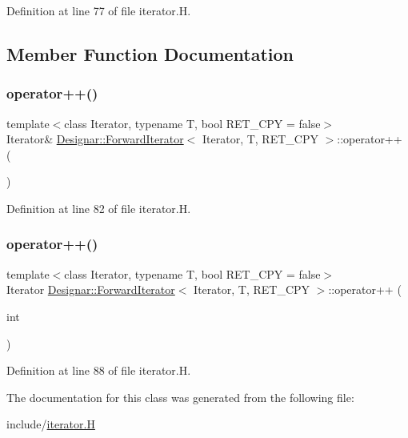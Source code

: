 Definition at line 77 of file iterator.\+H.



\subsection{Member Function Documentation}
\mbox{\label{class_designar_1_1_forward_iterator_a021a9305def76c968872089a778d2b41}} 
\subsubsection{\texorpdfstring{operator++()}{operator++()}\hspace{0.1cm}{\footnotesize\ttfamily [1/2]}}
{\footnotesize\ttfamily template$<$class Iterator, typename T, bool R\+E\+T\+\_\+\+C\+PY = false$>$ \\
Iterator\& \hyperlink{class_designar_1_1_forward_iterator}{Designar\+::\+Forward\+Iterator}$<$ Iterator, T, R\+E\+T\+\_\+\+C\+PY $>$\+::operator++ (\begin{DoxyParamCaption}{ }\end{DoxyParamCaption})\hspace{0.3cm}{\ttfamily [inline]}}



Definition at line 82 of file iterator.\+H.

\mbox{\label{class_designar_1_1_forward_iterator_a7182625f3375ba05868ae6f240628b1c}} 
\subsubsection{\texorpdfstring{operator++()}{operator++()}\hspace{0.1cm}{\footnotesize\ttfamily [2/2]}}
{\footnotesize\ttfamily template$<$class Iterator, typename T, bool R\+E\+T\+\_\+\+C\+PY = false$>$ \\
Iterator \hyperlink{class_designar_1_1_forward_iterator}{Designar\+::\+Forward\+Iterator}$<$ Iterator, T, R\+E\+T\+\_\+\+C\+PY $>$\+::operator++ (\begin{DoxyParamCaption}\item[{int}]{ }\end{DoxyParamCaption})\hspace{0.3cm}{\ttfamily [inline]}}



Definition at line 88 of file iterator.\+H.



The documentation for this class was generated from the following file\+:\begin{DoxyCompactItemize}
\item 
include/\hyperlink{iterator_8_h}{iterator.\+H}\end{DoxyCompactItemize}
